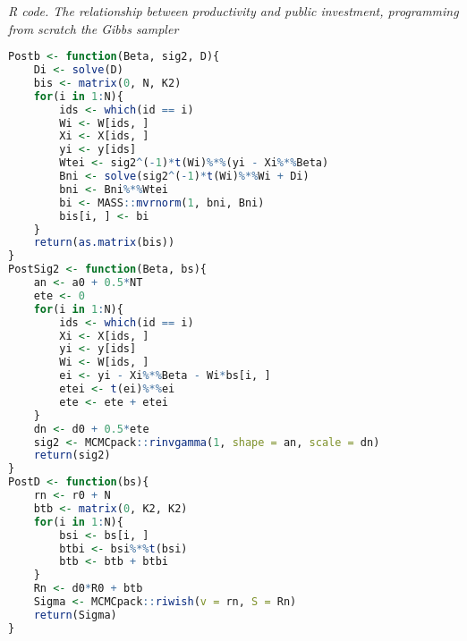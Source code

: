 \begin{enumerate}[leftmargin=*]
\begin{tcolorbox}[enhanced,width=4.67in,center upper,
	fontupper=\large\bfseries,drop shadow southwest,sharp corners]
	\textit{R code. The relationship between productivity and public investment, programming from scratch the Gibbs sampler}
	\begin{VF}
		\begin{lstlisting}[language=R]
Postb <- function(Beta, sig2, D){
	Di <- solve(D)
	bis <- matrix(0, N, K2)
	for(i in 1:N){
		ids <- which(id == i)
		Wi <- W[ids, ]
		Xi <- X[ids, ]
		yi <- y[ids]
		Wtei <- sig2^(-1)*t(Wi)%*%(yi - Xi%*%Beta)
		Bni <- solve(sig2^(-1)*t(Wi)%*%Wi + Di)
		bni <- Bni%*%Wtei
		bi <- MASS::mvrnorm(1, bni, Bni)
		bis[i, ] <- bi
	}
	return(as.matrix(bis))
}
PostSig2 <- function(Beta, bs){
	an <- a0 + 0.5*NT
	ete <- 0
	for(i in 1:N){
		ids <- which(id == i)
		Xi <- X[ids, ]
		yi <- y[ids]
		Wi <- W[ids, ]
		ei <- yi - Xi%*%Beta - Wi*bs[i, ]
		etei <- t(ei)%*%ei
		ete <- ete + etei
	}
	dn <- d0 + 0.5*ete 
	sig2 <- MCMCpack::rinvgamma(1, shape = an, scale = dn)
	return(sig2)
}
PostD <- function(bs){
	rn <- r0 + N
	btb <- matrix(0, K2, K2)
	for(i in 1:N){
		bsi <- bs[i, ]
		btbi <- bsi%*%t(bsi)
		btb <- btb + btbi
	}
	Rn <- d0*R0 + btb
	Sigma <- MCMCpack::riwish(v = rn, S = Rn)
	return(Sigma)
}
\end{lstlisting}
	\end{VF}
\end{tcolorbox}


\end{enumerate}
